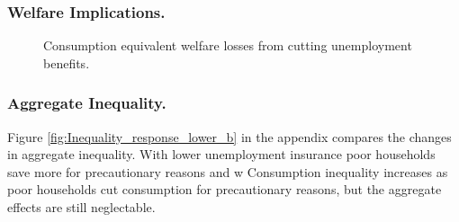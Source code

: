 \subsubsection{Welfare Implications.}



\begin{figure}[H]
\caption[Caption for LOF]{Consumption equivalent welfare losses from cutting unemployment benefits.}
\label{fig:lower_b_C_decomp_G}
\end{figure}

\subsubsection{Aggregate Inequality.} Figure \ref{fig:Inequality_response_lower_b} in the appendix compares the changes in aggregate inequality. With lower unemployment insurance poor households save more for precautionary reasons and w
Consumption inequality increases as poor households cut consumption for precautionary reasons, but the aggregate effects are still neglectable.  





